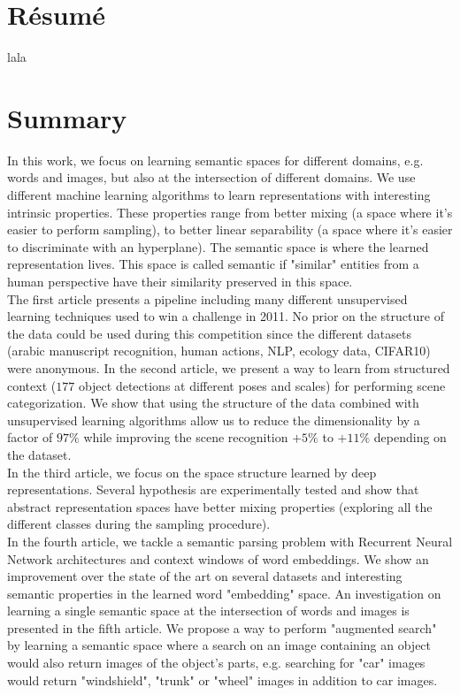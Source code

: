 \chapter*{R\'{e}sum\'{e}}

lala

\chapter*{Summary}

In this work, we focus on learning semantic spaces for different domains, e.g.
words and images, but also at the intersection of different domains. We use
different machine learning algorithms to learn representations with interesting
intrinsic properties. These properties range from better mixing (a space where
it's easier to perform sampling), to better linear separability (a space where
it's easier to discriminate with an hyperplane). The semantic space is where
the learned representation lives. This space is called semantic if "similar"
entities from a human perspective have their similarity preserved in this
space.\\

The first article presents a pipeline including many different unsupervised
learning techniques used to win a challenge in 2011. No prior on the structure
of the data could be used during this competition since the different datasets
(arabic manuscript recognition, human actions, NLP, ecology data, CIFAR10) were
anonymous. In the second article, we present a way to learn from structured
context ($177$ object detections at different poses and scales) for performing
scene categorization. We show that using the structure of the data combined
with unsupervised learning algorithms allow us to reduce the dimensionality by
a factor of $97\%$ while improving the scene recognition $+5\%$ to $+11\%$
depending on the dataset.\\

In the third article, we focus on the space structure learned by deep
representations. Several hypothesis are experimentally tested and show that
abstract representation spaces have better mixing properties (exploring all the
different classes during the sampling procedure).\\

In the fourth article, we tackle a semantic parsing problem with Recurrent
Neural Network architectures and context windows of word embeddings. We show an
improvement over the state of the art on several datasets and interesting
semantic properties in the learned word "embedding" space.  An investigation on
learning a single semantic space at the intersection of words and images is
presented in the fifth article. We propose a way to perform "augmented search"
by learning a semantic space where a search on an image containing an object
would also return images of the object's parts, e.g. searching for "car" images
would return "windshield", "trunk" or "wheel" images in addition to car images.
